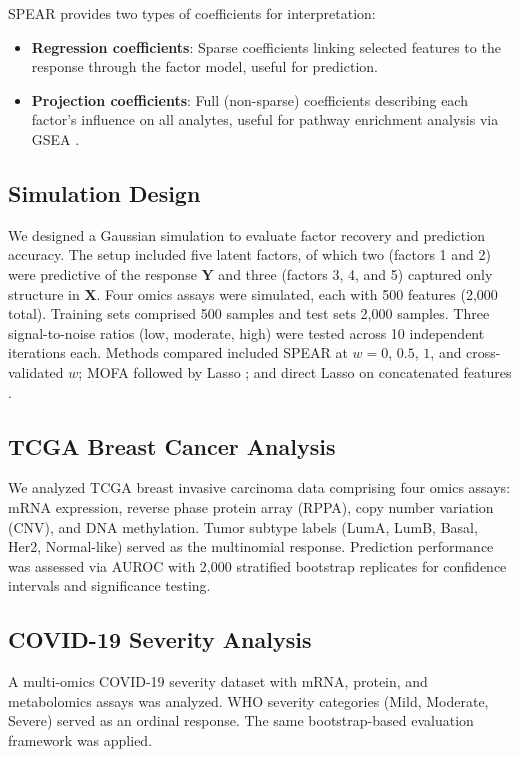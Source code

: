 \documentclass[11pt]{article}
\begin{document}
SPEAR provides two types of coefficients for interpretation:
\begin{itemize}
\item \textbf{Regression coefficients}: Sparse coefficients linking selected features to the response through the factor model, useful for prediction.
\item \textbf{Projection coefficients}: Full (non-sparse) coefficients describing each factor's influence on all analytes, useful for pathway enrichment analysis via GSEA \citep{subramanian2005gsea}.
\end{itemize}

\subsection{Simulation Design}

We designed a Gaussian simulation to evaluate factor recovery and prediction accuracy. The setup included five latent factors, of which two (factors 1 and 2) were predictive of the response $\mathbf{Y}$ and three (factors 3, 4, and 5) captured only structure in $\mathbf{X}$. Four omics assays were simulated, each with 500 features (2,000 total). Training sets comprised 500 samples and test sets 2,000 samples. Three signal-to-noise ratios (low, moderate, high) were tested across 10 independent iterations each. Methods compared included SPEAR at $w = 0$, $0.5$, $1$, and cross-validated $w$; MOFA followed by Lasso \citep{argelaguet2018mofa}; and direct Lasso on concatenated features \citep{tibshirani1996lasso}.

\subsection{TCGA Breast Cancer Analysis}

We analyzed TCGA breast invasive carcinoma data \citep{tcga2012breast} comprising four omics assays: mRNA expression, reverse phase protein array (RPPA), copy number variation (CNV), and DNA methylation. Tumor subtype labels (LumA, LumB, Basal, Her2, Normal-like) served as the multinomial response. Prediction performance was assessed via AUROC with 2,000 stratified bootstrap replicates for confidence intervals and significance testing.

\subsection{COVID-19 Severity Analysis}

A multi-omics COVID-19 severity dataset \citep{overmyer2021covid} with mRNA, protein, and metabolomics assays was analyzed. WHO severity categories (Mild, Moderate, Severe) served as an ordinal response. The same bootstrap-based evaluation framework was applied.
\end{document}
